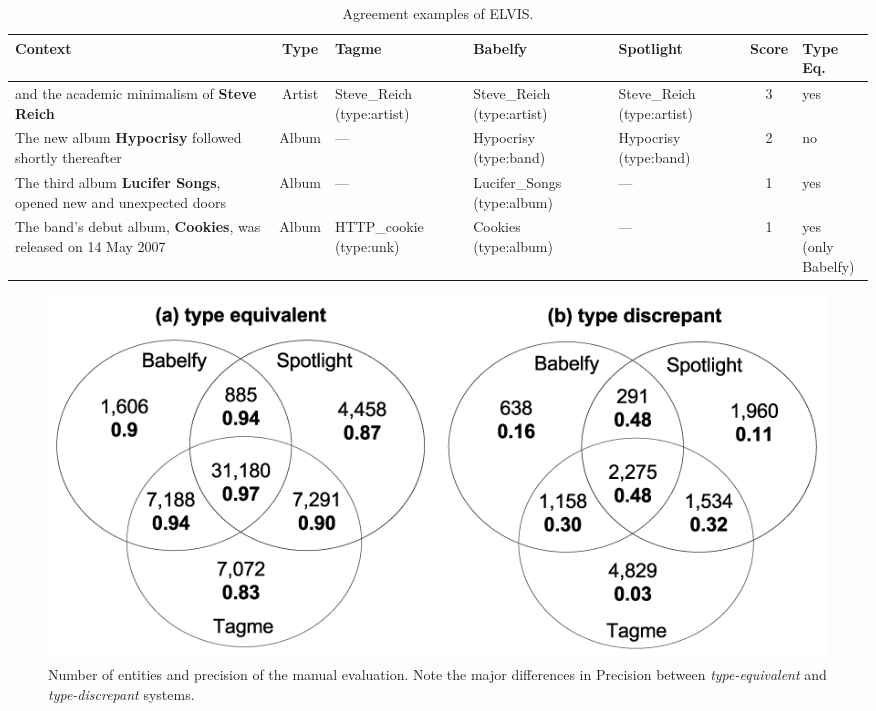 \begin{table}[!t]
\scriptsize
\def\arraystretch{1.2}
\centering
	\begin{tabular}{| p{2cm} | c | L{1.8cm} | L{1.8cm} | L{1.5cm} | c | L{1cm} |}
\hline
\textbf{Context} & \textbf{Type} & \textbf{Tagme} & \textbf{Babelfy} & \textbf{Spotlight} & \textbf{Score} & \textbf{Type Eq.} \\
\hline
and the academic minimalism of \textbf{Steve Reich} & Artist &  Steve\_Reich (type:artist) & Steve\_Reich (type:artist) & Steve\_Reich (type:artist) & 3 & yes \\
\hline
The new album \textbf{Hypocrisy} followed shortly thereafter & Album & --- & Hypocrisy (type:band) & Hypocrisy (type:band) & 2 & no \\
\hline
The third album \textbf{Lucifer Songs}, opened new and unexpected doors & Album & --- & Lucifer\_Songs (type:album) & --- & 1 & yes \\
\hline
The band's debut album, \textbf{Cookies}, was released on 14 May 2007 & Album & HTTP\_cookie {\footnotesize{(type:unk)}} & Cookies (type:album) & --- & 1 & \parbox[t]{1cm}{\centering yes\\ (only\\ Babelfy)} \\
\hline
	\end{tabular}
	\caption{Agreement examples of ELVIS.}
	\label{tbl:linking:examples}
\end{table}



\begin{figure}[!t]
  \centering
	\includegraphics[width=\textwidth]{ch03_linking_pics/evaluation_both_bn.png}
  \caption[Number of entities and precision of the manual evaluation.]{Number of entities and precision of the manual evaluation.  Note the major differences in Precision between \textit{type-equivalent} and \textit{type-discrepant} systems.}
  \label{fig:linking:agreement_typed}
\end{figure}

